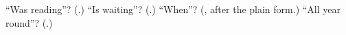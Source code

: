 \begin{tcolorbox}[breakable,colback=teal!4,colframe=teal!35!black,title={Before you move on}]
\textquotedblleft{}Was reading\textquotedblright{}? (\textbf{}.) \textquotedblleft{}Is waiting\textquotedblright{}? (\textbf{}.) \textquotedblleft{}When\textquotedblright{}? (\textbf{}, after the plain form.) \textquotedblleft{}All year round\textquotedblright{}? (\textbf{}.)
\end{tcolorbox}
